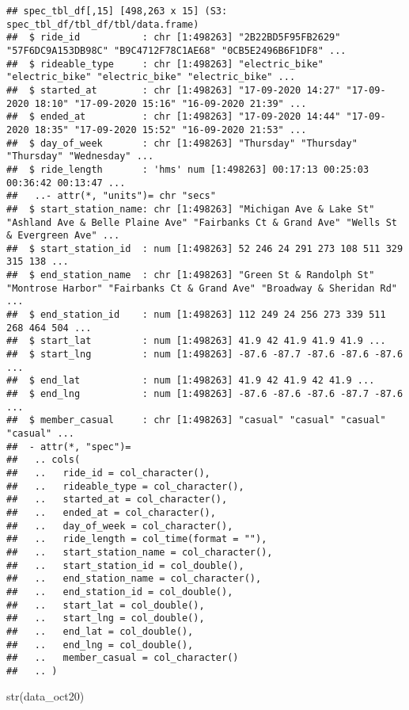 \documentclass[
]{article}
\newenvironment{Shaded}{\begin{snugshade}}{\end{snugshade}}
\newcommand{\FunctionTok}[1]{\textcolor[rgb]{0.00,0.00,0.00}{#1}}
\newcommand{\NormalTok}[1]{#1}
\begin{document}
\begin{verbatim}
## spec_tbl_df[,15] [498,263 x 15] (S3: spec_tbl_df/tbl_df/tbl/data.frame)
##  $ ride_id           : chr [1:498263] "2B22BD5F95FB2629" "57F6DC9A153DB98C" "B9C4712F78C1AE68" "0CB5E2496B6F1DF8" ...
##  $ rideable_type     : chr [1:498263] "electric_bike" "electric_bike" "electric_bike" "electric_bike" ...
##  $ started_at        : chr [1:498263] "17-09-2020 14:27" "17-09-2020 18:10" "17-09-2020 15:16" "16-09-2020 21:39" ...
##  $ ended_at          : chr [1:498263] "17-09-2020 14:44" "17-09-2020 18:35" "17-09-2020 15:52" "16-09-2020 21:53" ...
##  $ day_of_week       : chr [1:498263] "Thursday" "Thursday" "Thursday" "Wednesday" ...
##  $ ride_length       : 'hms' num [1:498263] 00:17:13 00:25:03 00:36:42 00:13:47 ...
##   ..- attr(*, "units")= chr "secs"
##  $ start_station_name: chr [1:498263] "Michigan Ave & Lake St" "Ashland Ave & Belle Plaine Ave" "Fairbanks Ct & Grand Ave" "Wells St & Evergreen Ave" ...
##  $ start_station_id  : num [1:498263] 52 246 24 291 273 108 511 329 315 138 ...
##  $ end_station_name  : chr [1:498263] "Green St & Randolph St" "Montrose Harbor" "Fairbanks Ct & Grand Ave" "Broadway & Sheridan Rd" ...
##  $ end_station_id    : num [1:498263] 112 249 24 256 273 339 511 268 464 504 ...
##  $ start_lat         : num [1:498263] 41.9 42 41.9 41.9 41.9 ...
##  $ start_lng         : num [1:498263] -87.6 -87.7 -87.6 -87.6 -87.6 ...
##  $ end_lat           : num [1:498263] 41.9 42 41.9 42 41.9 ...
##  $ end_lng           : num [1:498263] -87.6 -87.6 -87.6 -87.7 -87.6 ...
##  $ member_casual     : chr [1:498263] "casual" "casual" "casual" "casual" ...
##  - attr(*, "spec")=
##   .. cols(
##   ..   ride_id = col_character(),
##   ..   rideable_type = col_character(),
##   ..   started_at = col_character(),
##   ..   ended_at = col_character(),
##   ..   day_of_week = col_character(),
##   ..   ride_length = col_time(format = ""),
##   ..   start_station_name = col_character(),
##   ..   start_station_id = col_double(),
##   ..   end_station_name = col_character(),
##   ..   end_station_id = col_double(),
##   ..   start_lat = col_double(),
##   ..   start_lng = col_double(),
##   ..   end_lat = col_double(),
##   ..   end_lng = col_double(),
##   ..   member_casual = col_character()
##   .. )
\end{verbatim}

\begin{Shaded}
\begin{Highlighting}[]
\FunctionTok{str}\NormalTok{(data\_oct20)}
\end{Highlighting}
\end{Shaded}
\end{document}
